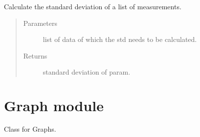 \documentclass[letterpaper,10pt,english]{sphinxmanual}
\begin{document}

\begin{fulllineitems}
\label{\detokenize{dataProcessing:dataProcessing.standardDeviation}}
\sphinxAtStartPar
Calculate the standard deviation of a list of measurements.
\begin{quote}\begin{description}
\item[{Parameters}] \leavevmode
\sphinxAtStartPar
{} \textendash{} list of data of which the std needs to be calculated.

\item[{Returns}] \leavevmode
\sphinxAtStartPar
standard deviation of param.

\end{description}\end{quote}

\begin{sphinxVerbatim}[commandchars=\\\{\}]
\PYG{p}{[}       \PYG{p}{]}
\end{sphinxVerbatim}

\end{fulllineitems}



\section{Graph module}
\label{\detokenize{Graph:module-Graph}}\label{\detokenize{Graph:graph-module}}\label{\detokenize{Graph::doc}}
\sphinxAtStartPar
Class for Graphs.
\end{document}
